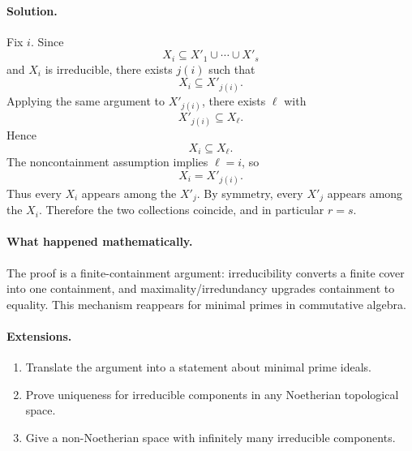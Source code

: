 \paragraph{Solution.}
Fix \(i\).  Since
\[
X_i\subseteq X'_1\cup\cdots\cup X'_s
\]
and \(X_i\) is irreducible, there exists \(j(i)\) such that
\[
X_i\subseteq X'_{j(i)}.
\]
Applying the same argument to \(X'_{j(i)}\), there exists \(\ell\) with
\[
X'_{j(i)}\subseteq X_\ell.
\]
Hence
\[
X_i\subseteq X_\ell.
\]
The noncontainment assumption implies \(\ell=i\), so
\[
X_i=X'_{j(i)}.
\]
Thus every \(X_i\) appears among the \(X'_j\).  By symmetry, every \(X'_j\) appears among
the \(X_i\).  Therefore the two collections coincide, and in particular \(r=s\).

\paragraph{What happened mathematically.}
The proof is a finite-containment argument: irreducibility converts a finite cover into
one containment, and maximality/irredundancy upgrades containment to equality.  This
mechanism reappears for minimal primes in commutative algebra.

\paragraph{Extensions.}
\begin{enumerate}
\item Translate the argument into a statement about minimal prime ideals.
\item Prove uniqueness for irreducible components in any Noetherian topological space.
\item Give a non-Noetherian space with infinitely many irreducible components.
\end{enumerate}
\fi
